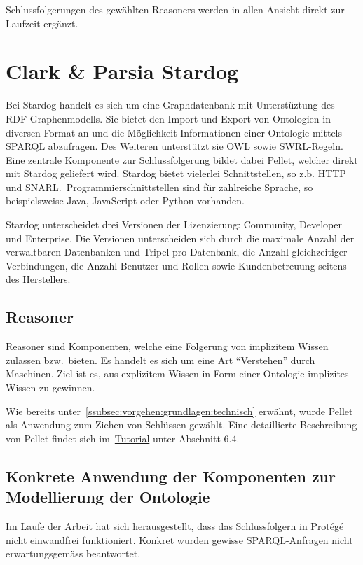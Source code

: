 Schlussfolgerungen des gewählten Reasoners werden in allen Ansicht direkt zur Laufzeit ergänzt.

\section{Clark \& Parsia Stardog}
\label{sec:komponenten_stardog}
Bei Stardog handelt es sich um eine Graphdatenbank mit Unterstüztung des RDF-Graphenmodells. Sie bietet den Import und Export von Ontologien in diversen Format an und die Möglichkeit Informationen einer Ontologie mittels SPARQL abzufragen. Des Weiteren unterstützt sie OWL sowie SWRL-Regeln. Eine zentrale Komponente zur Schlussfolgerung bildet dabei Pellet, welcher direkt mit Stardog geliefert wird. Stardog bietet vielerlei Schnittstellen, so z.b. HTTP und SNARL.\ Programmierschnittstellen sind für zahlreiche Sprache, so beispielsweise Java, JavaScript oder Python vorhanden.~\cite{stardogDocu}

Stardog unterscheidet drei Versionen der Lizenzierung: Community, Developer und Enterprise. Die Versionen unterscheiden sich durch die maximale Anzahl der verwaltbaren Datenbanken und Tripel pro Datenbank, die Anzahl gleichzeitiger Verbindungen, die Anzahl Benutzer und Rollen sowie Kundenbetreuung seitens des Herstellers.~\cite{stardog}

\subsection{Reasoner}
\label{subsec:komponenten_reasoner}
Reasoner sind Komponenten, welche eine Folgerung von implizitem Wissen zulassen bzw.\ bieten. Es handelt es sich um eine Art ``Verstehen'' durch Maschinen. Ziel ist es, aus explizitem Wissen in Form einer Ontologie implizites Wissen zu gewinnen.

Wie bereits unter~\autoref{ssubsec:vorgehen:grundlagen:technisch} erwähnt, wurde Pellet als Anwendung zum Ziehen von Schlüssen gewählt. Eine detaillierte Beschreibung von Pellet findet sich im~\hyperref[sec:anhang:tutorial_dokument]{Tutorial} unter Abschnitt 6.4.

\subsection{Konkrete Anwendung der Komponenten zur Modellierung der Ontologie}
\label{subsec:komponenten_anwendung}
Im Laufe der Arbeit hat sich herausgestellt, dass das Schlussfolgern in Protégé nicht einwandfrei funktioniert. Konkret wurden gewisse SPARQL-Anfragen nicht erwartungsgemäss beantwortet.

